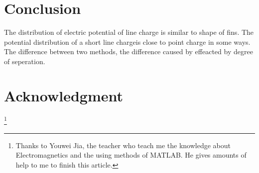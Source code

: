 \documentclass[10pt, journal, final]{IEEEtran}
\begin{document}
\section{
  Conclusion
 }
The distribution of electric potential of line charge is similar to shape of fins.
The potential distribution of a short line chargeis close to point charge in some ways.
The difference between two methods, the difference caused by  effeacted by degree of seperation.
\label{conclusion}

\section*{Acknowledgment}
\thanks{
    Thanks to Youwei Jia, the teacher who teach me the knowledge about Electromagnetics
    and the using methods of MATLAB. He gives amounts of help to me to finish this article.
}
\end{document}

